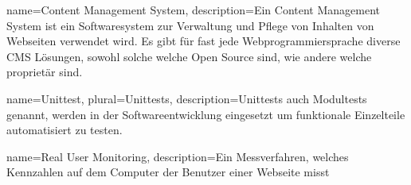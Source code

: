 {
  name={Content Management System},
  description={Ein Content Management System ist ein Softwaresystem zur Verwaltung und Pflege von Inhalten von Webseiten verwendet wird. Es gibt für fast jede Webprogrammiersprache diverse CMS Lösungen, sowohl solche welche Open Source sind, wie andere welche proprietär sind.}
}

{
  name=Unittest,
  plural=Unittests,
  description={Unittests auch Modultests genannt, werden in der Softwareentwicklung eingesetzt um funktionale Einzelteile automatisiert zu testen.\cite[S. 44]{books/daglib/0007083}}
}

{
  name={Real User Monitoring},
  description={Ein Messverfahren, welches Kennzahlen auf dem Computer der Benutzer einer Webseite misst}
}




\renewcommand*{\glsgroupskip}{}